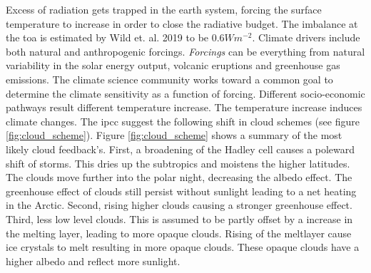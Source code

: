 Excess of radiation gets trapped in the earth system, forcing the surface temperature to increase in order to close the radiative budget. The imbalance at the \acrfull{toa} is estimated by Wild et. al. 2019 to be $0.6W m^{-2}$. 
Climate drivers include both natural and anthropogenic forcings. \textit{Forcings} can be everything from natural variability in the solar energy output, volcanic eruptions and greenhouse gas emissions. The climate science community works toward a common goal to determine the climate sensitivity as a function of forcing. Different socio-economic pathways result different temperature increase. The temperature increase induces climate changes. The \acrfull{ipcc} suggest the following shift in cloud schemes (see figure \ref{fig:cloud_scheme}). Figure \ref{fig:cloud_scheme} shows a summary of the most likely cloud feedback's. First, a broadening of the Hadley cell causes a poleward shift of storms. This dries up the subtropics and moistens the higher latitudes. The clouds move further into the polar night, decreasing the albedo effect. The greenhouse effect of clouds still persist without sunlight leading to a net heating in the Arctic. Second, rising higher clouds causing a stronger greenhouse effect. Third, less low level clouds. This is assumed to be partly offset by a increase in the melting layer, leading to more opaque clouds. Rising of the meltlayer cause ice crystals to melt resulting in more opaque clouds. These opaque clouds have a higher albedo and reflect more sunlight. 



